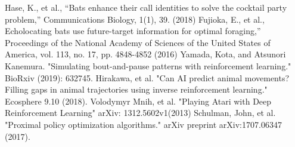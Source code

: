 \documentclass[../main]{subfiles}
\begin{document}
\begin{thebibliography}{99}
    Hase, K., et al., “Bats enhance their call identities to solve the cocktail party problem,” Communications Biology, 1(1), 39. (2018)
    Fujioka, E., et al., Echolocating bats use future-target information for optimal foraging,” Proceedings of the National Academy of Sciences of the United States of America, vol. 113, no. 17, pp. 4848-4852 (2016)
    Yamada, Kota, and Atsunori Kanemura. "Simulating bout-and-pause patterns with reinforcement learning." BioRxiv (2019): 632745.
    Hirakawa, et al. "Can AI predict animal movements? Filling gaps in animal trajectories using inverse reinforcement learning." Ecosphere 9.10 (2018).
    Volodymyr Mnih, et al. "Playing Atari with Deep Reinforcement Learning" arXiv: 1312.5602v1(2013)
    Schulman, John, et al. "Proximal policy optimization algorithms." arXiv preprint arXiv:1707.06347 (2017).
\end{thebibliography}
\end{document}
